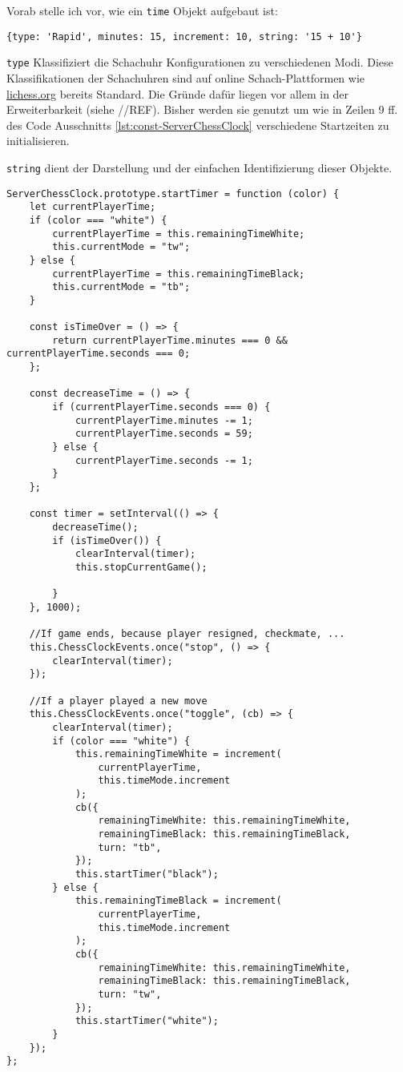 Vorab stelle ich vor, wie ein \verb|time| Objekt aufgebaut ist:
\begin{verbatim}
{type: 'Rapid', minutes: 15, increment: 10, string: '15 + 10'}
\end{verbatim}
\verb|type| Klassifiziert die Schachuhr Konfigurationen zu verschiedenen Modi. Diese Klassifikationen der Schachuhren sind auf online Schach-Plattformen wie \url{lichess.org} bereits Standard. Die Gründe dafür liegen vor allem in der Erweiterbarkeit (siehe //REF). Bisher werden sie genutzt um wie in Zeilen 9 ff. des Code Ausschnitts \ref{lst:const-ServerChessClock} verschiedene Startzeiten zu initialisieren.

\verb|string| dient der Darstellung und der einfachen Identifizierung dieser Objekte.

\begin{lstlisting}[style=codeStyle, caption={Die startTimer und stopCurrentGame Methoden der ServerChessClock Klasse}, label={lst:startTimer}]
ServerChessClock.prototype.startTimer = function (color) {
    let currentPlayerTime;
    if (color === "white") {
        currentPlayerTime = this.remainingTimeWhite;
        this.currentMode = "tw";
    } else {
        currentPlayerTime = this.remainingTimeBlack;
        this.currentMode = "tb";
    }

    const isTimeOver = () => {
        return currentPlayerTime.minutes === 0 && currentPlayerTime.seconds === 0;
    };

    const decreaseTime = () => {
        if (currentPlayerTime.seconds === 0) {
            currentPlayerTime.minutes -= 1;
            currentPlayerTime.seconds = 59;
        } else {
            currentPlayerTime.seconds -= 1;
        }
    };

    const timer = setInterval(() => {
        decreaseTime();
        if (isTimeOver()) {
            clearInterval(timer);
            this.stopCurrentGame();

        }
    }, 1000);
    
	//If game ends, because player resigned, checkmate, ...
    this.ChessClockEvents.once("stop", () => {
        clearInterval(timer);
    });
    
    //If a player played a new move
    this.ChessClockEvents.once("toggle", (cb) => {
        clearInterval(timer);
        if (color === "white") {
            this.remainingTimeWhite = increment(
                currentPlayerTime,
                this.timeMode.increment
            );
            cb({
                remainingTimeWhite: this.remainingTimeWhite,
                remainingTimeBlack: this.remainingTimeBlack,
                turn: "tb",
            });
            this.startTimer("black");
        } else {
            this.remainingTimeBlack = increment(
                currentPlayerTime,
                this.timeMode.increment
            );
            cb({
                remainingTimeWhite: this.remainingTimeWhite,
                remainingTimeBlack: this.remainingTimeBlack,
                turn: "tw",
            });
            this.startTimer("white");
        }
    });
};


\end{lstlisting}
